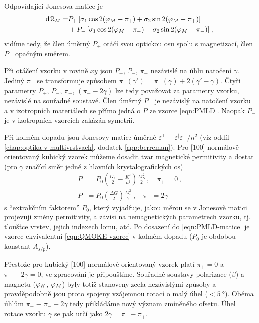 Odpovídající Jonesova matice je 
\begin{align}
    \label{eqn:dR-kubicky}
    \textrm{d}\mathcal{R}_M = &P_+ \left[\sigma_1\cos2(\varphi_M-\pi_+) + \sigma_2 \sin2(\varphi_M-\pi_+)\right] \\ 
                              & + P_- \left[\sigma_1\cos2(\varphi_M-\pi_-) - \sigma_2 \sin2(\varphi_M-\pi_-) \right] \,,
\end{align}
vidíme tedy, že člen úměrný $P_+$ otáčí svou optickou osu spolu s magnetizací, člen $P_-$ opačným směrem.

Při otáčení vzorku v rovině $xy$ jsou $P_+$, $P_-$, $\pi_+$ nezávislé na úhlu natočení $\gamma$.
Jediný $\pi_-$ se transformuje způsobem $\pi_-(\gamma')=\pi_-(\gamma)+2(\gamma'-\gamma)$.
Čtyři parametry $P_+$, $P_-$, $\pi_+$, $(\pi_--2\gamma)$ lze tedy považovat za parametry vzorku, nezávislé na souřadné soustavě.
Člen úměrný $P_+$ je nezávislý na natočení vzorku a v izotropních materiálech se přímo jedná o $P$ ze vzorce \ref{eqn:PMLD}.
Naopak $P_-$ je v izotropních vzorcích zakázán symetrií.

Při kolmém dopadu jsou Jonesovy matice úměrné $\varepsilon^\perp-\varepsilon^\vert\varepsilon^-/n^2$ (viz oddíl \ref{chap:optika-v-multivrstvach}, dodatek \ref{app:berreman}).
Pro [100]-normálově orientovaný kubický vzorek můžeme dosadit tvar magnetické permitivity a dostat (pro $\gamma$ značící směr jedné z hlavních krystalografických os)
\begin{align}
    \label{eqn:PMLD-kubicke}
    P_+ = P_0 \left(\frac{G_s}{2} - \frac{K^2}{n^2}\right) \frac{M_S^2}{2} \,,\quad \pi_+=0 \,,\\
    P_- = P_0 \left(\frac{\Delta G}{2}\right) \frac{M_S^2}{2} \,,\quad \pi_-=2\gamma
\end{align}
s ``extrakčním faktorem'' $P_0$, který vyjadřuje, jakou měrou se v Jonesově matici projevují změny permitivity, a závisí na nemagnetických parametrech vzorku, tj. tloušťce vrstev, jejich indexech lomu, atd.
Po dosazení do \eqref{eqn:PMLD-matice} je vzorec ekvivalentní \eqref{eqn:QMOKE-vzorec} v kolmém dopadu ($P_0$ je obdobou konstant $A_{s/p}$).

Přestože pro kubický [100]-normálově orientovaný vzorek platí $\pi_+=0$ a $\pi_--2\gamma=0$, ve zpracování je připouštíme.
Souřadné soustavy polarizace ($\beta$) a magnetu ($\varphi_H$, $\varphi_M$) byly totiž stanoveny zcela nezávislými způsoby a pravděpodobně jsou proto spojeny vzájemnou rotací o malý úhel ($<\SI{5}{\degree}$).
Oběma úhlům $\pi_+ \equiv \pi_--2\gamma$ tedy přikládáme nový význam zmíněného ofsetu.
Úhel rotace vzorku $\gamma$ se pak určí jako $2\gamma = \pi_- - \pi_+$.

